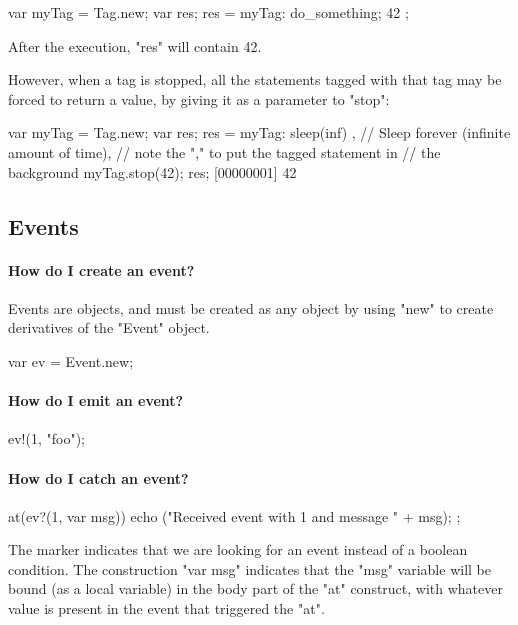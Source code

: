 \begin{urbifixme}
var myTag = Tag.new;
var res;
res = { myTag: { do_something; 42 } };
\end{urbifixme}

After the execution, "res" will contain 42.

However, when a tag is stopped, all the statements tagged with that tag may
be forced to return a value, by giving it as a parameter to "stop":

\begin{urbifixme}
var myTag = Tag.new;
var res;
{ res = { myTag: sleep(inf) } }, // Sleep forever (infinite amount of time),
                                 // note the "," to put the tagged statement in
                                 // the background
myTag.stop(42);
res;
[00000001] 42
\end{urbifixme}

\subsection{Events}
\paragraph{How do I create an event?}
Events are objects, and must be created as any object by using "new" to create
derivatives of the "Event" object.

\begin{urbifixme}
var ev = Event.new;
\end{urbifixme}

\paragraph{How do I emit an event?}
\begin{urbifixme}
ev!(1, "foo");
\end{urbifixme}

\paragraph{How do I catch an event?}
\begin{urbifixme}
at(ev?(1, var msg)) {
  echo ("Received event with 1 and message " + msg);
};
\end{urbifixme}

The  marker indicates that we are looking for an event instead of a
boolean condition. The construction "var msg" indicates that the "msg"
variable will be bound (as a local variable) in the body part of the "at"
construct, with whatever value is present in the event that triggered the
"at".

